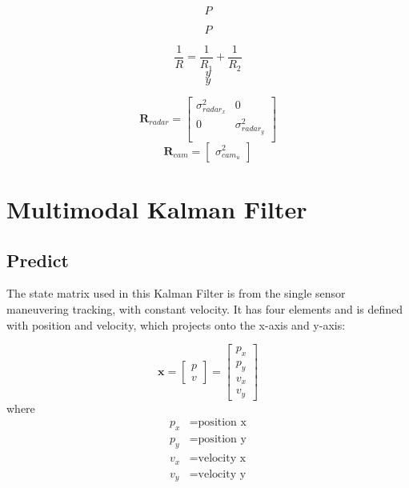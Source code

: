 \begin{equation}\label{equ:bayes1}
P
\end{equation}

\begin{equation}\label{equ:bayes2}
    P
\end{equation}

\begin{equation}\label{equ:bayes3}
    \frac{1}{R}=\frac{1}{R_1}+\frac{1}{R_2}
\end{equation}
\begin{equation}\label{equ:bayes4}
    y
\end{equation}
\begin{equation}\label{equ:bayes5}
    y
\end{equation}

\begin{equation}\label{equ:2-radar_R}
    \mathbf{R}_{radar} = 
    \begin{bmatrix}
        \sigma_{radar_x}^2 & 0 \\
        0 & \sigma_{radar_y}^2 \\
      \end{bmatrix}
\end{equation}
\begin{equation}\label{equ:2-R_cam}
    \mathbf{R}_{cam} = 
    \begin{bmatrix}
        \sigma_{cam_u}^2
    \end{bmatrix}
\end{equation}


\section{Multimodal Kalman Filter}\label{sec:2-kalman_filter}
\subsection{Predict}\label{sec:2-predict}
The state matrix used in this Kalman Filter is from the single sensor maneuvering tracking, with constant velocity.
It has four elements and is defined with position and velocity, which projects onto the x-axis and y-axis:

\begin{equation}\label{equ:state_eq}
    \mathbf{x} = 
        \begin{bmatrix} 
        p \\ 
        v 
        \end{bmatrix} = 
        \begin{bmatrix} 
        p_x \\ 
        p_y \\ 
        v_x \\ 
        v_y 
        \end{bmatrix}
\end{equation}
where
\begin{align*}
    p_x &=\text{position x}\\
    p_y &=\text{position y}\\
    v_x &=\text{velocity x}\\
    v_y &=\text{velocity y}\\
\end{align*}

